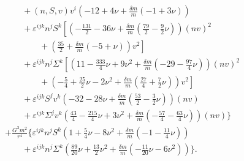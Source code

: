 {\begin{align}
& \qquad+ (n,S,v) v^{i}\left(-12 + 4 \nu+\frac{\delta m}{m}\left(-1 + 3 \nu\right)\right) \nonumber \\ 
& \qquad+ \varepsilon^{ijk} n^{j} S^{k}\left[\left(-\frac{131}{2} -36 \nu+\frac{\delta m}{m}\left(\frac{79}{2} -\frac{9}{2} \nu\right)\right) (nv)^2\right.\nonumber\\
    &\left.\qquad\qquad+\left(\frac{35}{2}+\frac{\delta m}{m}\left(-5 + \nu\right)\right) v^{2}\right] \nonumber \\ 
& \qquad+ \varepsilon^{ijk} n^{j} \Sigma^{k}\left[\left(11 -\frac{333}{4} \nu + 9 \nu^2+\frac{\delta m}{m}\left(-29 -\frac{97}{4} \nu\right)\right) (nv)^2\right.\nonumber\\
    &\left.\qquad\qquad+\left(-\frac{5}{4} + \frac{25}{2} \nu -2 \nu^2+\frac{\delta m}{m}\left(\frac{27}{4} + \frac{7}{2} \nu\right)\right) v^{2}\right] \nonumber \\ 
& \qquad+ \varepsilon^{ijk} S^{j} v^{k}\left(-32 -28 \nu+\frac{\delta m}{m}\left(\frac{53}{2} -\frac{3}{2} \nu\right)\right) (nv) \nonumber \\ 
& \qquad+ \varepsilon^{ijk} \Sigma^{j} v^{k}\left(\frac{43}{4} -\frac{215}{4} \nu + 3 \nu^2+\frac{\delta m}{m}\left(-\frac{57}{4} -\frac{63}{4} \nu\right)\right) (nv)\bigg\}\nonumber \\
 &+\frac{G^{3}m^{2}}{r^{4}}\bigg\{\varepsilon^{ijk} n^{j} S^{k}\left(1 + \frac{5}{4} \nu -8 \nu^2+\frac{\delta m}{m}\left(-1 -\frac{11}{4} \nu\right)\right) \nonumber \\ 
& \qquad+ \varepsilon^{ijk} n^{j} \Sigma^{k}\left(\frac{89}{20} \nu + \frac{13}{2} \nu^2+\frac{\delta m}{m}\left(-\frac{11}{20} \nu -6 \nu^2\right)\right)\bigg\}.
\end{align}}